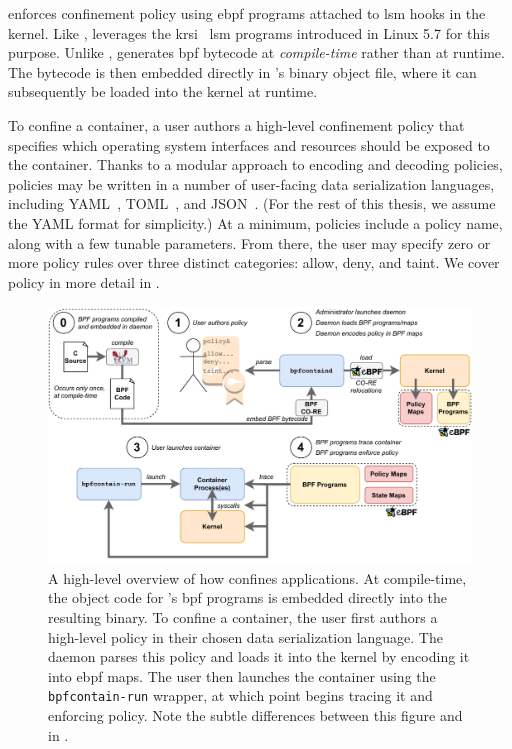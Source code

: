 \bpfcontain{} enforces confinement policy using \gls{ebpf} programs attached to \gls{lsm}
hooks in the kernel. Like \bpfbox{}, \bpfcontain{} leverages the
\gls{krsi}~\cite{singh2019_krsi} \gls{lsm} programs introduced in Linux 5.7 for this
purpose. Unlike \bpfbox{}, \bpfcontain{} generates \gls{bpf} bytecode at
\textit{compile-time} rather than at runtime. The bytecode is then embedded directly in
\bpfcontain{}'s binary object file, where it can subsequently be loaded into the kernel at
runtime.

To confine a container, a user authors a high-level confinement policy that specifies
which operating system interfaces and resources should be exposed to the container.
Thanks to a modular approach to encoding and decoding policies, \bpfcontain{} policies may
be written in a number of user-facing data serialization languages, including
YAML~\cite{yaml}, TOML~\cite{toml}, and JSON~\cite{json}. (For the rest of this thesis, we
assume the YAML format for simplicity.) At a minimum, \bpfcontain{} policies include
a policy name, along with a few tunable parameters. From there, the user may specify zero
or more policy rules over three distinct categories: allow, deny, and taint. We cover
\bpfcontain{} policy in more detail in .

\begin{figure}[htpb]
  \centering
  \includegraphics[width=1\linewidth]{figs/bpfcontain/overview.pdf}
  \caption[A high-level overview of how \bpfcontain{} confines applications]{
    A high-level overview of how \bpfcontain{} confines applications.  At compile-time,
    the object code for \bpfcontain{}'s \gls{bpf} programs is embedded directly into the
    resulting binary. To confine a container, the user first authors a high-level policy
    in their chosen data serialization language. The daemon parses this policy and loads
    it into the kernel by encoding it into \gls{ebpf} maps. The user then launches the
    container using the \texttt{bpfcontain-run} wrapper, at which point \bpfcontain{}
    begins tracing it and enforcing policy. Note the subtle differences between this
    figure and  in .
  }%
  \label{fig:bpfcontain-overview}
\end{figure}

